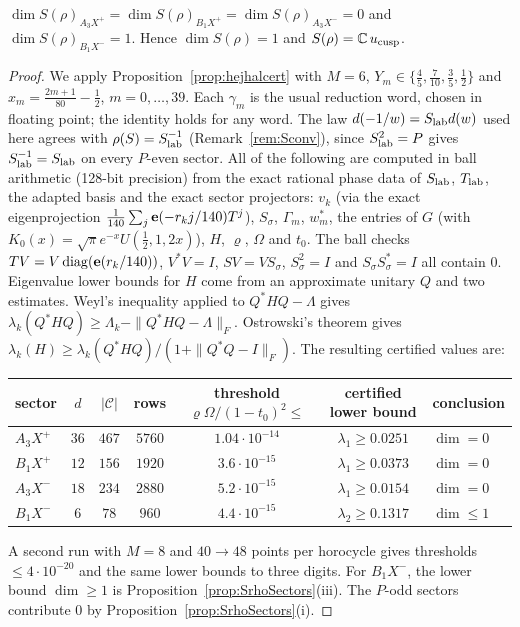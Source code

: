 \begin{theorem}\label{thm:SrhoDim}
$\dim S(\rho)_{A_3X^+}=\dim S(\rho)_{B_1X^+}=\dim S(\rho)_{A_3X^-}=0$ and $\dim S(\rho)_{B_1X^-}=1$. Hence $\dim S(\rho)=1$ and $S(\rho)=\mathbb{C}\,u_{\rm cusp}$.
\end{theorem}
\begin{proof}
We apply Proposition~\ref{prop:hejhalcert} with $M=6$, $Y_m\in\{\tfrac45,\tfrac7{10},\tfrac35,\tfrac12\}$ and $x_m=\tfrac{2m+1}{80}-\tfrac12$, $m=0,\dots,39$. Each $\gamma_m$ is the usual reduction word, chosen in floating point; the identity holds for any word. The law $d(-1/w)=S_{\rm lab}d(w)$ used here agrees with $\rho(S)=S_{\rm lab}^{-1}$ (Remark~\ref{rem:Sconv}), since $S_{\rm lab}^2=P$ gives $S_{\rm lab}^{-1}=S_{\rm lab}$ on every $P$-even sector.
All of the following are computed in ball arithmetic (128-bit precision) from the exact rational phase data of $S_{\rm lab}$, $T_{\rm lab}$, the adapted basis and the exact sector projectors:
$v_k$ (via the exact eigenprojection $\frac1{140}\sum_{j}\mathbf{e}(-r_kj/140)T^j$), $S_\sigma$, $\Gamma_m$, $w_m^*$, the entries of $G$ (with $K_0(x)=\sqrt\pi e^{-x}U(\tfrac12,1,2x)$), $H$, $\varrho$, $\Omega$ and $t_0$.
The ball checks $TV=V\,\mathrm{diag}(\mathbf{e}(r_k/140))$, $V^*V=I$, $SV=VS_\sigma$, $S_\sigma^2=I$ and $S_\sigma S_\sigma^*=I$ all contain $0$.
Eigenvalue lower bounds for $H$ come from an approximate unitary $Q$ and two estimates. Weyl's inequality applied to $Q^*HQ-\Lambda$ gives $\lambda_k(Q^*HQ)\ge\Lambda_k-\|Q^*HQ-\Lambda\|_F$. Ostrowski's theorem gives $\lambda_k(H)\ge\lambda_k(Q^*HQ)/(1+\|Q^*Q-I\|_F)$.
The resulting certified values are:
\begin{center}\small
\begin{tabular}{lcccccl}\toprule
sector & $d$ & $|\mathcal C|$ & rows & threshold $\varrho\Omega/(1-t_0)^2\le$ & certified lower bound & conclusion\\\midrule
$A_3X^+$ & $36$ & $467$ & $5760$ & $1.04\cdot10^{-14}$ & $\lambda_1\ge0.0251$ & $\dim=0$\\
$B_1X^+$ & $12$ & $156$ & $1920$ & $3.6\cdot10^{-15}$ & $\lambda_1\ge0.0373$ & $\dim=0$\\
$A_3X^-$ & $18$ & $234$ & $2880$ & $5.2\cdot10^{-15}$ & $\lambda_1\ge0.0154$ & $\dim=0$\\
$B_1X^-$ & $6$ & $78$ & $960$ & $4.4\cdot10^{-15}$ & $\lambda_2\ge0.1317$ & $\dim\le1$\\\bottomrule
\end{tabular}
\end{center}
A second run with $M=8$ and $40\to48$ points per horocycle gives thresholds $\le4\cdot10^{-20}$ and the same lower bounds to three digits.
For $B_1X^-$, the lower bound $\dim\ge1$ is Proposition~\ref{prop:SrhoSectors}(iii). The $P$-odd sectors contribute $0$ by Proposition~\ref{prop:SrhoSectors}(i).
\end{proof}
